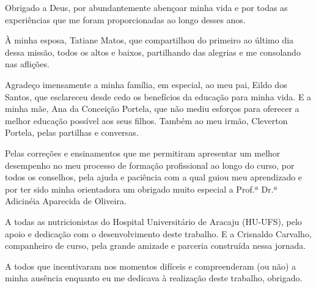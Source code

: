 \begin{agradecimentos}

Obrigado a Deus, por abundantemente abençoar minha vida e por todas as experiências que me foram proporcionadas ao longo desses anos.

À minha esposa, Tatiane Matos, que compartilhou do primeiro ao último dia dessa missão, todos os altos e baixos, partilhando das alegrias e me consolando nas aflições. 

Agradeço imensamente a minha família, em especial, ao meu pai, Eildo dos Santos, que esclareceu desde cedo os benefícios da educação para minha vida. E a minha mãe, Ana da Conceição Portela, que não mediu esforços para oferecer a melhor educação possível aos seus filhos. Também ao meu irmão, Cleverton Portela, pelas partilhas e conversas. 

Pelas correções e ensinamentos que me permitiram apresentar um melhor desempenho no meu processo de formação profissional ao longo do curso, por todos os conselhos, pela ajuda e paciência com a qual guiou meu aprendizado e por ter sido minha orientadora um obrigado muito especial a Prof.ª Dr.ª Adicinéia Aparecida de Oliveira.

A todas as nutricionistas do Hospital Universitário de Aracaju (HU-UFS), pelo apoio e dedicação com o desenvolvimento deste trabalho. E a Crisnaldo Carvalho, companheiro de curso, pela grande amizade e parceria construída nessa jornada.

A todos que incentivaram nos momentos difíceis e compreenderam (ou não) a minha ausência enquanto eu me dedicava à realização deste trabalho, obrigado.

\end{agradecimentos}
